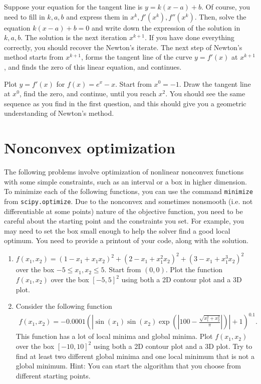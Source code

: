 \documentclass{article}
\begin{document}
\begin{enumerate}
    Suppose your equation for the tangent line is $y=k(x-a)+b$. Of course, you need to fill in $k,a,b$ and express them in $x^k, f'(x^k), f''(x^k)$. Then, solve the equation $k(x-a)+b=0$ and write down the expression of the solution in $k,a,b$. The solution is the next iteration $x^{k+1}$. If you have done everything correctly, you should recover the Newton's iterate. The next step of Newton's method starts from $x^{k+1}$, forms the tangent line of the curve $y=f'(x)$ at $x^{k+1}$, and finds the zero of this linear equation, and continues.
    
    Plot $y=f'(x)$ for $f(x)=e^x-x$. Start from $x^0=-1$. Draw the tangent line at $x^0$, find the zero, and continue, until you reach $x^2$. You should see the same sequence as you find in the first question, and this should give you a geometric understanding of Newton's method.
    
    
\end{enumerate}

\section{Nonconvex optimization}
The following problems involve optimization of nonlinear nonconvex functions with some simple constraints, such as an interval or a box in higher dimension. 
To minimize each of the following functions, you can use the command {\tt minimize} from {\tt scipy.optimize}. Due to the nonconvex and sometimes nonsmooth (i.e. not differentiable at some points) nature of the objective function, you need to be careful about the starting point and the constraints you set. For example, you may need to set the box small enough to help the solver find a good local optimum. You need to provide a printout of your code, along with the solution. 

\begin{enumerate}

\item $f(x_1, x_2)=(1-x_1+x_1x_2)^2+(2-x_1+x_1^2x_2)^2+(3-x_1+x_1^3x_2)^2$ over the box $-5\le x_1, x_2 \le 5$. Start from $(0,0)$. Plot the function $f(x_1,x_2)$ over the box $[-5,5]^2$ using both a 2D contour plot and a 3D plot.


\item Consider the following function 
\begin{align*}
    f(x_1,x_2) = -0.0001\left(\left|\sin(x_1)\sin(x_2)\exp\left(\left|100-\frac{\sqrt{x_1^2+x_2^2}}{\pi}\right|\right)\right|+1\right)^{0.1}.
\end{align*}
This function has a lot of local minima and global minima. Plot $f(x_1,x_2)$ over the box $[-10,10]^2$ using both a 2D contour plot and a 3D plot. Try to find at least two different global minima and one local minimum that is not a global minimum. Hint: You can start the algorithm that you choose from different starting points.
\end{enumerate}
\end{document}

